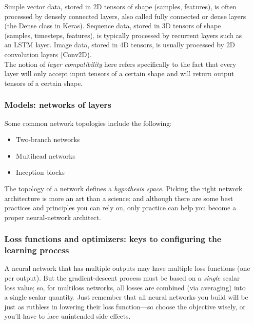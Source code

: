 \documentclass{article}
\numberwithin{equation}{section} %
\begin{document}
Simple vector data, stored in 2D tensors of shape (samples, features), is often processed by densely connected layers, also called fully connected or dense layers (the Dense class in Keras). Sequence data, stored in 3D tensors of shape (samples,
timesteps, features), is typically processed by recurrent layers such as an LSTM layer. Image data, stored in 4D tensors, is usually processed by 2D convolution layers (Conv2D). \\

The notion of \textit{layer compatibility} here refers specifically to the fact that every layer will only accept input tensors of a certain shape and will return output tensors of a certain shape. \\

\subsubsection{Models: networks of layers}

Some common network topologies include the following:

\begin{itemize}
	\item Two-branch networks
	\item Multihead networks
	\item Inception blocks
\end{itemize}

The topology of a network defines a \textit{hypothesis space}. Picking the right network architecture is more an art than a science; and although there are some best practices and principles you can rely on, only practice can help you become a proper neural-network architect. \\


\subsubsection{Loss functions and optimizers: keys to configuring the learning process}

A neural network that has multiple outputs may have multiple loss functions (one per
output). But the gradient-descent process must be based on a \textit{single} scalar loss value; so, for multiloss networks, all losses are combined (via averaging) into a single scalar quantity. Just remember that all neural networks you build will be just as ruthless in lowering their loss function—so choose the objective wisely, or you’ll have to face unintended side effects. \\
\end{document}
